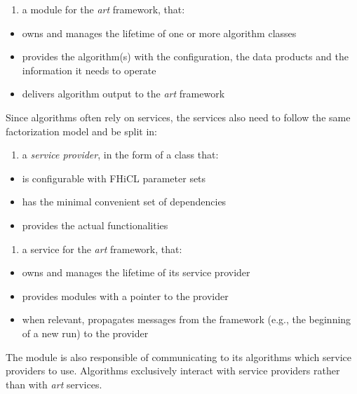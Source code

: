 \documentclass{article}
\begin{document}
\begin{enumerate}
\def\labelenumi{\arabic{enumi}.}
\setcounter{enumi}{1}
\item
  a module for the \emph{art} framework, that:
\end{enumerate}

\begin{itemize}
\item
  owns and manages the lifetime of one or more algorithm classes
\item
  provides the algorithm(s) with the configuration, the data products
  and the information it needs to operate
\item
  delivers algorithm output to the \emph{art} framework
\end{itemize}

Since algorithms often rely on services, the services also need to
follow the same factorization model and be split in:

\begin{enumerate}
\def\labelenumi{\arabic{enumi}.}
\item
  a \emph{service provider}, in the form of a class that:
\end{enumerate}

\begin{itemize}
\item
  is configurable with FHiCL parameter sets
\item
  has the minimal convenient set of dependencies
\item
  provides the actual functionalities
\end{itemize}

\begin{enumerate}
\def\labelenumi{\arabic{enumi}.}
\setcounter{enumi}{1}
\item
  a service for the \emph{art} framework, that:
\end{enumerate}

\begin{itemize}
\item
  owns and manages the lifetime of its service provider
\item
  provides modules with a pointer to the provider
\item
  when relevant, propagates messages from the framework (e.g., the
  beginning of a new run) to the provider
\end{itemize}

The module is also responsible of communicating to its algorithms which
service providers to use. Algorithms exclusively interact with service
providers rather than with \emph{art} services.
\end{document}
